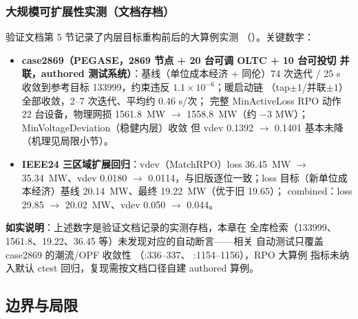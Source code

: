 \subsubsection*{大规模可扩展性实测（文档存档）}
验证文档第 5 节记录了内层目标重构前后的大算例实测
（）。关键数字：
\begin{itemize}
  \item \textbf{case2869（PEGASE，2869 节点 + 20 台可调 OLTC + 10 台可投切
        并联，authored 测试系统）}：基线（单位成本经济 + 同伦）74 次迭代 /
        25 s 收敛到参考目标 133999，约束违反 $1.1\times10^{-6}$；暖启动链
        （tap$\pm1$/并联$\pm1$）全部收敛，2--7 次迭代、平均约 0.46 s/次；
        完整 MinActiveLoss RPO 动作 22 台设备，物理网损 1561.8~MW
        $\to$ 1558.8~MW（约 $-3$ MW）；MinVoltageDeviation（稳健内层）收敛
        但 vdev 0.1392 $\to$ 0.1401 基本未降（机理见局限小节）。
  \item \textbf{IEEE24 三区域扩展回归}：vdev（MatchRPO）loss 36.45~MW
        $\to$ 35.34~MW、vdev 0.0180 $\to$ 0.0114，与旧版逐位一致；loss
        目标（新单位成本经济）基线 20.14~MW、最终 19.22~MW（优于旧 19.65）；
        combined：loss 29.85 $\to$ 20.02~MW、vdev 0.050 $\to$ 0.044。
\end{itemize}
\textbf{如实说明}：上述数字是验证文档记录的实测存档，本章在 
全库检索（133999、1561.8、19.22、36.45 等）未发现对应的自动断言——相关
自动测试只覆盖 case2869 的潮流/OPF 收敛性
（:336--337、
:1154--1156），RPO 大算例
指标未纳入默认 ctest 回归，复现需按文档口径自建 authored 算例。

\subsection{边界与局限}

